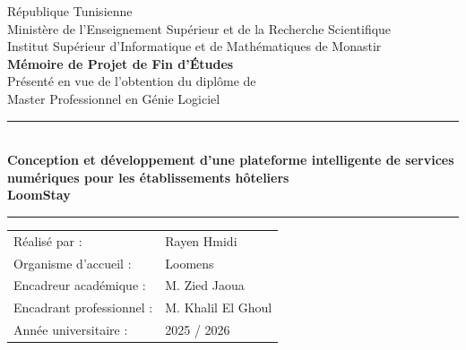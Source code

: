 \begin{titlepage}
\centering
\vspace*{1cm}
{\Large République Tunisienne\\Ministère de l'Enseignement Supérieur et de la Recherche Scientifique\\}
\vspace{0.8cm}
{\Large Institut Supérieur d'Informatique et de Mathématiques de Monastir\\}
\vspace{0.5cm}
\vspace{0.5cm}
{\Huge \textbf{Mémoire de Projet de Fin d'Études}\\}
\vspace{0.6cm}
{\Large Présenté en vue de l'obtention du diplôme de\\Master Professionnel en Génie Logiciel\\}
\vspace{1cm}
\rule{0.9\textwidth}{0.5pt}\\[0.5cm]
{\LARGE \textbf{Conception et développement d'une plateforme intelligente de services numériques pour les établissements hôteliers}}\\[0.3cm]
{\LARGE \textbf{LoomStay}}\\
\rule{0.9\textwidth}{0.5pt}
\vfill
\begin{tabular}{ll}
Réalisé par :              & Rayen Hmidi \\
Organisme d'accueil :      & Loomens \\
Encadreur académique :     & M. Zied Jaoua \\
Encadrant professionnel :  & M. Khalil El Ghoul \\
Année universitaire :      & 2025 / 2026 \\
\end{tabular}
\vfill
\end{titlepage}
